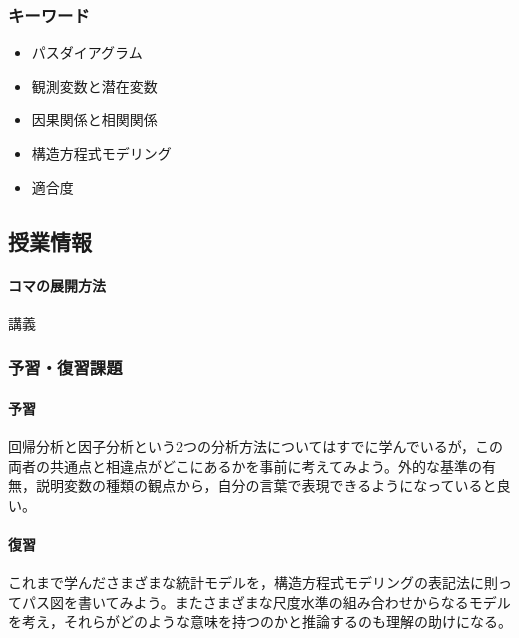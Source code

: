 \subsubsection{キーワード}
\begin{itemize}
	\item パスダイアグラム
	\item 観測変数と潜在変数
	\item 因果関係と相関関係
	\item 構造方程式モデリング
	\item 適合度
\end{itemize}
\subsection{授業情報}
\paragraph{コマの展開方法}
講義
\subsubsection{予習・復習課題}
\paragraph{予習} 回帰分析と因子分析という2つの分析方法についてはすでに学んでいるが，この両者の共通点と相違点がどこにあるかを事前に考えてみよう。外的な基準の有無，説明変数の種類の観点から，自分の言葉で表現できるようになっていると良い。
\paragraph{復習} これまで学んださまざまな統計モデルを，構造方程式モデリングの表記法に則ってパス図を書いてみよう。またさまざまな尺度水準の組み合わせからなるモデルを考え，それらがどのような意味を持つのかと推論するのも理解の助けになる。